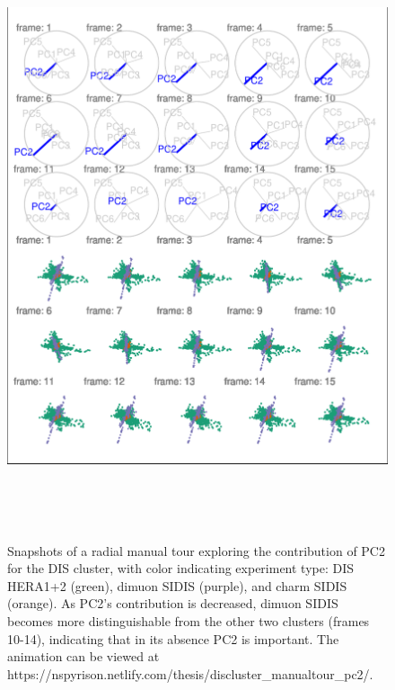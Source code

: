 \begin{Schunk}
\begin{figure}

{\centering \includegraphics[width=5.83in,height=7in]{spinifex_paper_files/figure-latex/DISclusterBad-1} 

}

\caption[Snapshots of a radial manual tour exploring the contribution of PC2 for the DIS cluster, with color indicating experiment type]{Snapshots of a radial manual tour exploring the contribution of PC2 for the DIS cluster, with color indicating experiment type: DIS HERA1+2 (green), dimuon SIDIS (purple), and charm SIDIS (orange). As PC2's contribution is decreased, dimuon SIDIS becomes more distinguishable from the other two clusters (frames 10-14), indicating that in its absence PC2 is important.  The animation can be viewed at https://nspyrison.netlify.com/thesis/discluster\_manualtour\_pc2/.}\label{fig:DISclusterBad}
\end{figure}
\end{Schunk}

